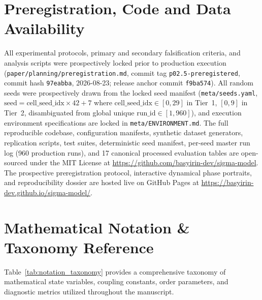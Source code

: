 \documentclass{article}
\theoremstyle{plain}
\theoremstyle{definition}
\begin{document}
\section*{Preregistration, Code and Data Availability}
All experimental protocols, primary and secondary falsification criteria, and analysis scripts were prospectively locked prior to production execution (\texttt{paper/planning/preregistration.md}, commit tag \texttt{p02.5-preregistered}, commit hash \texttt{97eabba}, 2026-08-23; release anchor commit \texttt{f9ba574}). All random seeds were prospectively drawn from the locked seed manifest (\texttt{meta/seeds.yaml}, $\text{seed} = \text{cell\_seed\_idx} \times 42 + 7$ where $\text{cell\_seed\_idx} \in [0, 29]$ in Tier~1, $[0, 9]$ in Tier~2, disambiguated from global unique $\text{run\_id} \in [1, 960]$), and execution environment specifications are locked in \texttt{meta/ENVIRONMENT.md}. The full reproducible codebase, configuration manifests, synthetic dataset generators, replication scripts, test suites, deterministic seed manifest, per-seed master run log (960 production runs), and 17 canonical processed evaluation tables are open-sourced under the MIT License at \url{https://github.com/basyirin-dev/sigma-model}. The prospective preregistration protocol, interactive dynamical phase portraits, and reproducibility dossier are hosted live on GitHub Pages at \url{https://basyirin-dev.github.io/sigma-model/}.



\newpage
\appendix

\section{Mathematical Notation \& Taxonomy Reference}
\label{sec:appendix_notation}

Table~\ref{tab:notation_taxonomy} provides a comprehensive taxonomy of mathematical state variables, coupling constants, order parameters, and diagnostic metrics utilized throughout the manuscript.
\end{document}
